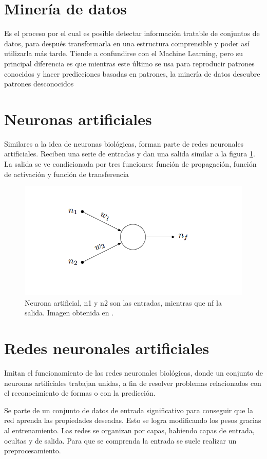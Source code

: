 \section{Minería de datos} Es el proceso por el cual es posible detectar información tratable de conjuntos de datos, para después transformarla en una estructura comprensible y poder así utilizarla más tarde.
Tiende a confundirse con el Machine Learning, pero su principal diferencia es que mientras este último se usa para reproducir patrones conocidos y hacer predicciones basadas en patrones, la minería de datos descubre patrones desconocidos\cite{mineria_datos}

\section{Neuronas artificiales}
Similares a la idea de neuronas biológicas, forman parte de redes neuronales artificiales. Reciben una serie de entradas y dan una salida similar a la figura \ref{fig:NeuArt}. La salida se ve condicionada por tres funciones: función de propagación, función de activación y función de transferencia\cite{neurona_artificial}

\begin{figure}
\centering
\includegraphics[width=.7\textwidth]{img/neurona_artificial}
\caption[Esquema de una neurona artificial]{Neurona artificial, n1 y n2 son las entradas, mientras que nf la salida. Imagen obtenida en \cite{neurona_artificial}.}
\label{fig:NeuArt}
\end{figure}

\section{Redes neuronales artificiales}
Imitan el funcionamiento de las redes neuronales biológicas, donde un conjunto de neuronas artificiales trabajan unidas, a fin de resolver problemas relacionados con el reconocimiento de formas o con la predicción. 

Se parte de un conjunto de datos de entrada significativo para conseguir que la red aprenda las propiedades deseadas. Esto se logra modificando los pesos gracias al entrenamiento. Las redes se organizan por capas, habiendo capas de entrada, ocultas y de salida. Para que se comprenda la entrada se suele realizar un preprocesamiento\cite{redes_neuronales}.

